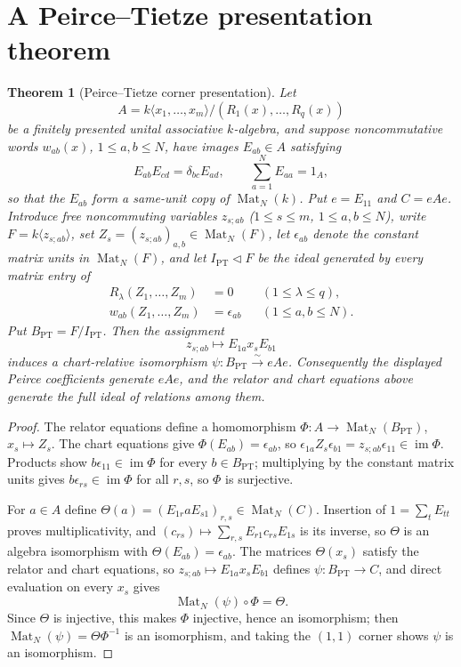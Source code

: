 \documentclass[11pt,reqno]{amsart}
\newtheorem{theorem}{Theorem}[section]
\theoremstyle{definition}
\theoremstyle{remark}
\theoremstyle{definition}
\newcommand{\Mat}{\operatorname{Mat}}
\newcommand{\PT}{\mathrm{PT}}
\begin{document}
\section{A Peirce--Tietze presentation theorem}\label{sec:peirce-tietze}

\begin{theorem}[Peirce--Tietze corner presentation]
\label{thm:PT}
Let
\[
 A=k\langle x_1,\ldots,x_m\rangle/(R_1(x),\ldots,R_q(x))
\]
be a finitely presented unital associative $k$-algebra, and suppose
noncommutative words $w_{ab}(x)$, $1\le a,b\le N$, have images $E_{ab}\in A$
satisfying
\[
 E_{ab}E_{cd}=\delta_{bc}E_{ad},\qquad\sum_{a=1}^NE_{aa}=1_A,
\]
so that the $E_{ab}$ form a same-unit copy of $\Mat_N(k)$.  Put $e=E_{11}$
and $C=eAe$.  Introduce free noncommuting variables $z_{s;ab}$
($1\le s\le m$, $1\le a,b\le N$), write $F=k\langle z_{s;ab}\rangle$, set
$Z_s=(z_{s;ab})_{a,b}\in\Mat_N(F)$, let $\epsilon_{ab}$ denote the constant
matrix units in $\Mat_N(F)$, and let $I_{\PT}\triangleleft F$ be the ideal
generated by every matrix entry of
\[
 \begin{aligned}
  R_\lambda(Z_1,\ldots,Z_m)&=0 &&(1\le\lambda\le q),\\
  w_{ab}(Z_1,\ldots,Z_m)&=\epsilon_{ab} &&(1\le a,b\le N).
 \end{aligned}
\]
Put $B_{\PT}=F/I_{\PT}$.  Then the assignment
\[
 z_{s;ab}\longmapsto E_{1a}x_sE_{b1}
\]
induces a chart-relative isomorphism $\psi:B_{\PT}\xrightarrow{\sim}eAe$.
Consequently the displayed Peirce coefficients generate $eAe$, and the
relator and chart equations above generate the full ideal of relations
among them.
\end{theorem}

\begin{proof}
The relator equations define a homomorphism
$\Phi:A\to\Mat_N(B_{\PT})$, $x_s\mapsto Z_s$.  The chart equations give
$\Phi(E_{ab})=\epsilon_{ab}$, so $\epsilon_{1a}Z_s\epsilon_{b1}=
z_{s;ab}\epsilon_{11}\in\operatorname{im}\Phi$.  Products show
$b\epsilon_{11}\in\operatorname{im}\Phi$ for every $b\in B_{\PT}$;
multiplying by the constant matrix units gives $b\epsilon_{rs}\in
\operatorname{im}\Phi$ for all $r,s$, so $\Phi$ is surjective.

For $a\in A$ define $\Theta(a)=(E_{1r}aE_{s1})_{r,s}\in\Mat_N(C)$.
Insertion of $1=\sum_tE_{tt}$ proves multiplicativity, and
$(c_{rs})\mapsto\sum_{r,s}E_{r1}c_{rs}E_{1s}$ is its inverse, so $\Theta$
is an algebra isomorphism with $\Theta(E_{ab})=\epsilon_{ab}$.  The
matrices $\Theta(x_s)$ satisfy the relator and chart equations, so
$z_{s;ab}\mapsto E_{1a}x_sE_{b1}$ defines $\psi:B_{\PT}\to C$, and direct
evaluation on every $x_s$ gives
\[
 \Mat_N(\psi)\circ\Phi=\Theta.
\]
Since $\Theta$ is injective, this makes $\Phi$ injective, hence an
isomorphism; then $\Mat_N(\psi)=\Theta\Phi^{-1}$ is an isomorphism, and
taking the $(1,1)$ corner shows $\psi$ is an isomorphism.  
\end{proof}
\end{document}
